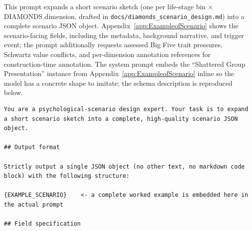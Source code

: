 \documentclass[11pt]{article}
\begin{document}
This prompt expands a short scenario sketch (one per life-stage bin $\times$ DIAMONDS dimension, drafted in \texttt{docs/diamonds\_scenario\_design.md}) into a complete scenario JSON object. Appendix~\ref{app:ExampleofScenario} shows the scenario-facing fields, including the metadata, background narrative, and trigger event; the prompt additionally requests assessed Big Five trait pressures, Schwartz value conflicts, and per-dimension annotation references for construction-time annotation. The system prompt embeds the ``Shattered Group Presentation'' instance from Appendix~\ref{app:ExampleofScenario} inline so the model has a concrete shape to imitate; the schema description is reproduced below.

\begin{tcolorbox}[
  breakable,
  colback=blue!5,
  colframe=blue!60!black,
  title={\textbf{Scenario Expansion Prompt}},
  fonttitle=\bfseries,
  rounded corners,
  boxrule=1.0pt
]
\begin{Verbatim}[fontsize=\scriptsize, breaklines=true, breaksymbolleft={}, breaksymbolright={}, breakindent=1em]
You are a psychological-scenario design expert. Your task is to expand a short scenario sketch into a complete, high-quality scenario JSON object.

## Output format

Strictly output a single JSON object (no other text, no markdown code block) with the following structure:

{EXAMPLE_SCENARIO}    <- a complete worked example is embedded here in the actual prompt

## Field specification


\end{Verbatim}
\end{tcolorbox}
\end{document}
